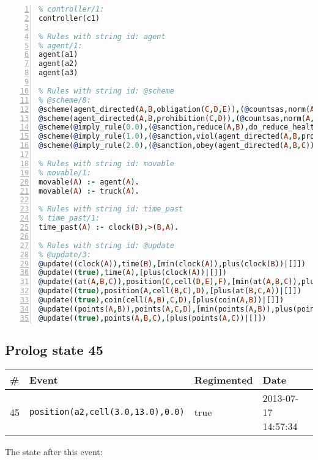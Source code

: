 \documentclass[11pt]{article}\usepackage[utf8]{inputenc}\usepackage{geometry}
\begin{document}
\begin{lstlisting}[language=Prolog, numbers=left]
% Rules with string id: controller
% controller/1:
controller(c1)

% Rules with string id: agent
% agent/1:
agent(a1)
agent(a2)
agent(a3)

% Rules with string id: @scheme
% @scheme/8:
@scheme(agent_directed(A,B,obligation(C,D,E)),(@countsas,norm(A,B,F,obligation(C,D,E)),F),false,(listTrue(C)),(time_past(D)),false,[plus(viol(agent_directed(A,B,obligation(C,D,E))))|[]],[plus(obey(agent_directed(A,B,obligation(C,D,E))))|[]])
@scheme(agent_directed(A,B,prohibition(C,D)),(@countsas,norm(A,B,E,prohibition(C,D)),E),(listTrue(C)),false,(false),false,[plus(viol(agent_directed(A,B,prohibition(C,D))))|[]],[plus(obey(agent_directed(A,B,prohibition(C,D))))|[]])
@scheme(@imply_rule(0.0),(@sanction,reduce(A,B),do_reduce_health(A,B),notifyAgent(A,changed(status))),true,false,false,false,[min(reduce(A,B))|[]],[])
@scheme(@imply_rule(1.0),(@sanction,viol(agent_directed(A,B,prohibition(C,D))),do_sanction(D)),true,false,false,false,[min(viol(agent_directed(A,B,prohibition(C,D))))|[]],[])
@scheme(@imply_rule(2.0),(@sanction,obey(agent_directed(A,B,C))),true,false,false,false,[min(obey(agent_directed(A,B,C)))|[]],[])

% Rules with string id: movable
% movable/1:
movable(A) :- agent(A).
movable(A) :- truck(A).

% Rules with string id: time_past
% time_past/1:
time_past(A) :- clock(B),>(B,A).

% Rules with string id: @update
% @update/3:
@update((clock(A)),time(B),[min(clock(A)),plus(clock(B))|[]])
@update((true),time(A),[plus(clock(A))|[]])
@update((at(A,B,C)),position(C,cell(D,E),F),[min(at(A,B,C)),plus(at(D,E,C))|[]])
@update((true),position(A,cell(B,C),D),[plus(at(B,C,A))|[]])
@update((true),coin(cell(A,B),C,D),[plus(coin(A,B))|[]])
@update((points(A,B)),points(A,C,D),[min(points(A,B)),plus(points(A,D))|[]])
@update((true),points(A,B,C),[plus(points(A,C))|[]])

\end{lstlisting}
\clearpage 
\subsection{Prolog state 45}
\begin{table}[ht]
\centering 
\begin{tabular}{l l l l} 
\textbf{\#} & \textbf{Event} & \textbf{Regimented} & \textbf{Date} \\ [0.5ex] 
\hline
45&\texttt{position(a2,cell(3.0,13.0),0.0)}&true&2013-07-17 14:57:34\\ [1ex] \hline\end{tabular}
\end{table}
The state after this event:
\end{document}
